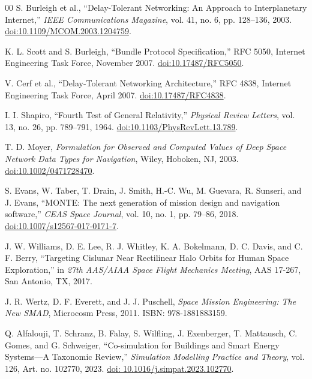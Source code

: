\documentclass[a4paper,fleqn]{cas-sc}
\begin{document}
\begin{thebibliography}{00}
 S. Burleigh et al., ``Delay-Tolerant Networking: An Approach to Interplanetary Internet,'' \textit{IEEE Communications Magazine}, vol. 41, no. 6, pp. 128--136, 2003. \href{https://doi.org/10.1109/MCOM.2003.1204759}{doi:10.1109/MCOM.2003.1204759}.

 K. L. Scott and S. Burleigh, ``Bundle Protocol Specification,'' RFC 5050, Internet Engineering Task Force, November 2007. \href{https://doi.org/10.17487/RFC5050}{doi:10.17487/RFC5050}.

 V. Cerf et al., ``Delay-Tolerant Networking Architecture,'' RFC 4838, Internet Engineering Task Force, April 2007. \href{https://doi.org/10.17487/RFC4838}{doi:10.17487/RFC4838}.

 I. I. Shapiro, ``Fourth Test of General Relativity,'' \textit{Physical Review Letters}, vol. 13, no. 26, pp. 789--791, 1964. \href{https://doi.org/10.1103/PhysRevLett.13.789}{doi:10.1103/PhysRevLett.13.789}.

 T. D. Moyer, \textit{Formulation for Observed and Computed Values of Deep Space Network Data Types for Navigation}, Wiley, Hoboken, NJ, 2003. \href{https://doi.org/10.1002/0471728470}{doi:10.1002/0471728470}.

 S. Evans, W. Taber, T. Drain, J. Smith, H.-C. Wu, M. Guevara, R. Sunseri, and J. Evans, ``MONTE: The next generation of mission design and navigation software,'' \textit{CEAS Space Journal}, vol. 10, no. 1, pp. 79--86, 2018. \href{https://doi.org/10.1007/s12567-017-0171-7}{doi:10.1007/s12567-017-0171-7}.

 J. W. Williams, D. E. Lee, R. J. Whitley, K. A. Bokelmann, D. C. Davis, and C. F. Berry, ``Targeting Cislunar Near Rectilinear Halo Orbits for Human Space Exploration,'' in \textit{27th AAS/AIAA Space Flight Mechanics Meeting}, AAS 17-267, San Antonio, TX, 2017.

 J. R. Wertz, D. F. Everett, and J. J. Puschell, \textit{Space Mission Engineering: The New SMAD}, Microcosm Press, 2011. ISBN: 978-1881883159.

 {\color{revcolor}Q. Alfalouji, T. Schranz, B. Falay, S. Wilfling, J. Exenberger, T. Mattausch, C. Gomes, and G. Schweiger, ``Co-simulation for Buildings and Smart Energy Systems---A Taxonomic Review,'' \textit{Simulation Modelling Practice and Theory}, vol. 126, Art. no. 102770, 2023. \href{https://doi.org/10.1016/j.simpat.2023.102770}{doi: 10.1016/j.simpat.2023.102770}.}


\end{thebibliography}
\end{document}
